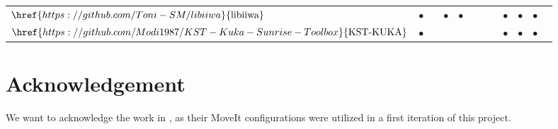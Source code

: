 \begin{landscape}
\begin{table}
{\begin{tabular}{llllllllllll}
$\href{https://github.com/Toni-SM/libiiwa}{\text{libiiwa}}$                    & $\bullet$ &           & $\bullet$ & $\bullet$ &                &           &           & $\bullet$        & $\bullet$         & $\bullet$                   &                    \\
$\href{https://github.com/Modi1987/KST-Kuka-Sunrise-Toolbox}{\text{KST-KUKA}}$ & $\bullet$ &           &           &           &                &           &           & $\bullet$        & $\bullet$         & $\bullet$                   &                    \\ \hline
\end{tabular}
}
\end{table}
\end{landscape}

\hypertarget{acknowledgement}{%
\section{Acknowledgement}\label{acknowledgement}}

We want to acknowledge the work in
\cite{ref-iiwa_stack}, as
their MoveIt configurations were utilized in a first iteration of this
project.
